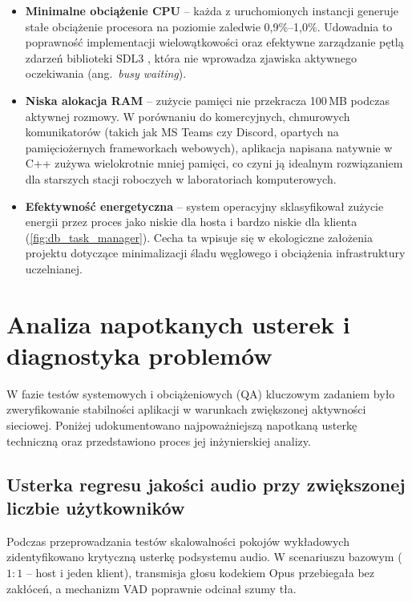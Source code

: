 \begin{itemize}
	\item \textbf{Minimalne obciążenie CPU} -- każda z uruchomionych instancji
	generuje stałe obciążenie procesora na poziomie zaledwie 0,9\%--1,0\%.
	Udowadnia to poprawność implementacji wielowątkowości oraz efektywne
	zarządzanie pętlą zdarzeń biblioteki SDL3 \cite{SDL3}, która nie
	wprowadza zjawiska aktywnego oczekiwania (ang.~\textit{busy waiting}).
	\item \textbf{Niska alokacja RAM} -- zużycie pamięci nie przekracza 100\,MB
	podczas aktywnej rozmowy. W porównaniu do komercyjnych, chmurowych
	komunikatorów (takich jak MS Teams czy Discord, opartych na
	pamięciożernych frameworkach webowych), aplikacja napisana natywnie
	w C++ zużywa wielokrotnie mniej pamięci, co czyni ją idealnym
	rozwiązaniem dla starszych stacji roboczych w laboratoriach komputerowych.
	\item \textbf{Efektywność energetyczna} -- system operacyjny sklasyfikował
	zużycie energii przez proces jako niskie dla hosta i bardzo niskie
	dla klienta (\cref{fig:db_task_manager}). Cecha ta wpisuje się
	w ekologiczne założenia projektu dotyczące minimalizacji śladu
	węglowego i obciążenia infrastruktury uczelnianej.
\end{itemize}

\section{Analiza napotkanych usterek i diagnostyka problemów}
\label{sec:db_usterki}

W fazie testów systemowych i obciążeniowych (QA) kluczowym zadaniem było
zweryfikowanie stabilności aplikacji w warunkach zwiększonej aktywności sieciowej.
Poniżej udokumentowano najpoważniejszą napotkaną usterkę techniczną oraz
przedstawiono proces jej inżynierskiej analizy.

\subsection{Usterka regresu jakości audio przy zwiększonej liczbie użytkowników}
\label{subsec:db_usterka_audio}

Podczas przeprowadzania testów skalowalności pokojów wykładowych zidentyfikowano
krytyczną usterkę podsystemu audio. W scenariuszu bazowym ($1:1$ -- host i jeden
klient), transmisja głosu kodekiem Opus \cite{OpusRFC} przebiegała bez zakłóceń,
a mechanizm VAD poprawnie odcinał szumy tła.

